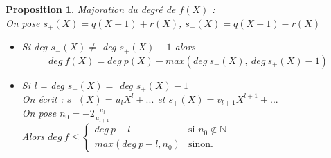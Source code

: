 \documentclass[17 pt]{scrartcl}
\newtheorem{prop}{Proposition}
\begin{document}
	\newpage
	\begin{prop}
	Majoration du degré de $f(X)$ : \\
	On pose $s_{+}(X) = q(X+1)+r(X)$, $s_{-}(X) = q(X+1)-r(X)$
	\begin{itemize}
	\item Si deg $s_{-}(X) \neq $ deg $s_{+}(X)-1$ alors 
		$$deg \ f(X) = deg \ p(X) - max(deg \ s_{-}(X),\ deg \ s_{+}(X) - 1)$$
    \item Si l = deg $s_{-}(X) = $ deg $s_{+}(X)-1$ \\
    	On écrit : $s_{-}(X) = u_lX^l + ... $ et $s_{+}(X) = v_{l+1}X^{l+1} + ... $ \\
    	On pose $n_0 = -2\frac{u_l}{u_{l+1}}$\\
    	Alors $deg \ f \leq  \left\{  \begin{array}{ll}
        deg \ p -l & \mbox{si } n_0 \notin \mathbb{N} \\
        max(deg \ p-l, n_0) & \mbox{sinon.}
    \end{array}
    \right.$
	\end{itemize}
	\end{prop}
	
\end{document}
